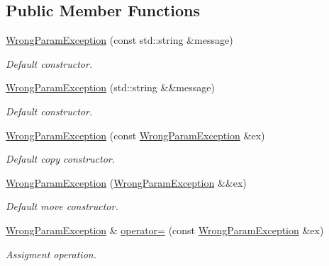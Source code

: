 \subsection*{Public Member Functions}
\begin{DoxyCompactItemize}
\item 
\hyperlink{class_dynamic_fast_buffers_1_1_wrong_param_exception_a4d3d296b0a2138f11e3ec7ecad27c9b0}{Wrong\-Param\-Exception} (const std\-::string \&message)
\begin{DoxyCompactList}\small\item\em Default constructor. \end{DoxyCompactList}\item 
\hyperlink{class_dynamic_fast_buffers_1_1_wrong_param_exception_aaeabc99b3c1d2970806d2eba31cf3130}{Wrong\-Param\-Exception} (std\-::string \&\&message)
\begin{DoxyCompactList}\small\item\em Default constructor. \end{DoxyCompactList}\item 
\hyperlink{class_dynamic_fast_buffers_1_1_wrong_param_exception_a2d1b559800e8a557098acccd60b81c64}{Wrong\-Param\-Exception} (const \hyperlink{class_dynamic_fast_buffers_1_1_wrong_param_exception}{Wrong\-Param\-Exception} \&ex)
\begin{DoxyCompactList}\small\item\em Default copy constructor. \end{DoxyCompactList}\item 
\hyperlink{class_dynamic_fast_buffers_1_1_wrong_param_exception_af7c0c7c36da7a88000fddfcdb4de7dc1}{Wrong\-Param\-Exception} (\hyperlink{class_dynamic_fast_buffers_1_1_wrong_param_exception}{Wrong\-Param\-Exception} \&\&ex)
\begin{DoxyCompactList}\small\item\em Default move constructor. \end{DoxyCompactList}\item 
\hyperlink{class_dynamic_fast_buffers_1_1_wrong_param_exception}{Wrong\-Param\-Exception} \& \hyperlink{class_dynamic_fast_buffers_1_1_wrong_param_exception_a7b43ed25c498d1e9a0d15baf10612857}{operator=} (const \hyperlink{class_dynamic_fast_buffers_1_1_wrong_param_exception}{Wrong\-Param\-Exception} \&ex)
\begin{DoxyCompactList}\small\item\em Assigment operation. \end{DoxyCompactList}\item 

\end{DoxyCompactItemize}
